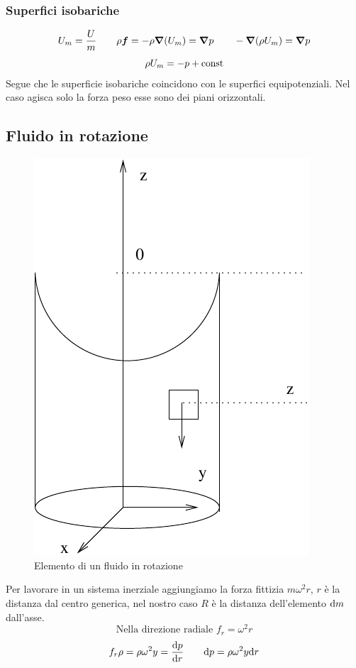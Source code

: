 \subsubsection{Superfici isobariche}
$$U_m=\frac{U}{m}\qquad \rho\boldsymbol{f}=-\rho\boldsymbol{\nabla}(U_m)=\boldsymbol{\nabla} p\qquad -\boldsymbol{\nabla}(\rho U_m)=\boldsymbol{\nabla} p$$
$$\rho U_m=-p+\text{const}$$
Segue che le superficie isobariche coincidono con le superfici equipotenziali. Nel caso agisca solo la forza peso esse sono dei piani orizzontali.

\subsection{Fluido in rotazione}
\begin{figure}[htbp]
\centering
\includegraphics[scale=0.65]{immagini/fisica1/fluido_rotazione}
\caption{Elemento di un fluido in rotazione}
\end{figure}
Per lavorare in un sistema inerziale aggiungiamo la forza fittizia $m\omega^2 r$, $r$ è la distanza dal centro generica, nel nostro caso $R$ è la distanza dell'elemento $\mathrm{d} m$ dall'asse.
$$\text{Nella direzione radiale } f_r=\omega^2 r$$
$$f_r\rho=\rho\omega^2 y=\frac{\mathrm{d} p}{\mathrm{d} r}\qquad \mathrm{d} p=\rho\omega^2 y\mathrm{d} r$$
